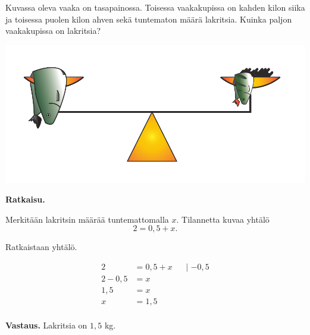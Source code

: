 \begin{esimerkki}
Kuvassa oleva vaaka on tasapainossa. Toisessa vaakakupissa on kahden kilon siika ja toisessa puolen kilon ahven sekä tuntematon määrä lakritsia. Kuinka paljon vaakakupissa on lakritsia?

\begin{center}
 \includegraphics[scale=0.6]{pictures/Kuva10-1-vaaka.pdf} %
 \end{center}


\textbf{Ratkaisu.}

Merkitään lakritsin määrää tuntemattomalla $x$. Tilannetta kuvaa yhtälö
\begin{equation*}
2 = 0{,5} + x.
\end{equation*}

Ratkaistaan yhtälö.

\begin{align*}
2 &= 0{,5} + x &&\text{| $-0{,5}$} \\
2 - 0{,5} &= x && \\
1{,5} &= x && \\
x &= 1{,5} && \\
\end{align*}


\textbf{Vastaus.} Lakritsia on $1{,5}$ kg.
\end{esimerkki}




